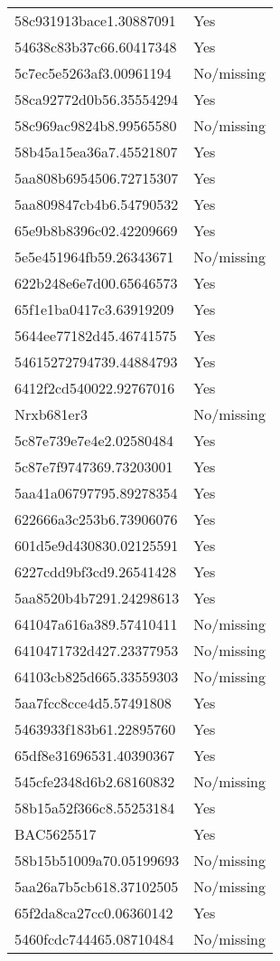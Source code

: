 \begin{tabular}{ll}
58c931913bace1.30887091 & Yes \\
54638c83b37c66.60417348 & Yes \\
5c7ec5e5263af3.00961194 & No/missing \\
58ca92772d0b56.35554294 & Yes \\
58c969ac9824b8.99565580 & No/missing \\
58b45a15ea36a7.45521807 & Yes \\
5aa808b6954506.72715307 & Yes \\
5aa809847cb4b6.54790532 & Yes \\
65e9b8b8396c02.42209669 & Yes \\
5e5e451964fb59.26343671 & No/missing \\
622b248e6e7d00.65646573 & Yes \\
65f1e1ba0417c3.63919209 & Yes \\
5644ee77182d45.46741575 & Yes \\
54615272794739.44884793 & Yes \\
6412f2cd540022.92767016 & Yes \\
Nrxb681er3 & No/missing \\
5c87e739e7e4e2.02580484 & Yes \\
5c87e7f9747369.73203001 & Yes \\
5aa41a06797795.89278354 & Yes \\
622666a3c253b6.73906076 & Yes \\
601d5e9d430830.02125591 & Yes \\
6227cdd9bf3cd9.26541428 & Yes \\
5aa8520b4b7291.24298613 & Yes \\
641047a616a389.57410411 & No/missing \\
6410471732d427.23377953 & No/missing \\
64103cb825d665.33559303 & No/missing \\
5aa7fcc8cce4d5.57491808 & Yes \\
5463933f183b61.22895760 & Yes \\
65df8e31696531.40390367 & Yes \\
545cfe2348d6b2.68160832 & No/missing \\
58b15a52f366c8.55253184 & Yes \\
BAC5625517 & Yes \\
58b15b51009a70.05199693 & No/missing \\
5aa26a7b5cb618.37102505 & No/missing \\
65f2da8ca27cc0.06360142 & Yes \\
5460fcdc744465.08710484 & No/missing \\

\end{tabular}
